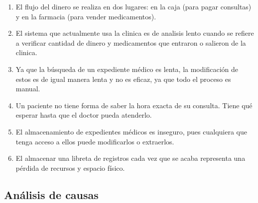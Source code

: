 \begin{enumerate}
\item El flujo del dinero se realiza en dos lugares: en la caja (para pagar consultas) y en la farmacia (para vender medicamentos).
\item El sistema que actualmente usa la clinica es de analisis lento cuando se refiere a verificar cantidad de dinero y medicamentos que entraron o salieron de la clinica.%
\item Ya que la b\'usqueda de un expediente m\'edico es lenta, la modificaci\'on de estos es de igual manera lenta y no es eficaz, ya que todo el proceso es manual. %
\item Un paciente no tiene forma de saber la hora exacta de su consulta. Tiene qu\'e esperar hasta que el doctor pueda atenderlo.
\item El almacenamiento de expedientes m\'edicos es inseguro, pues cualquiera que tenga acceso a ellos puede modificarlos o extraerlos.
\item El almacenar una libreta de registros cada vez que se acaba representa una p\'erdida de recursos y espacio f\'isico.

\end{enumerate}

\subsection{Análisis de causas}


